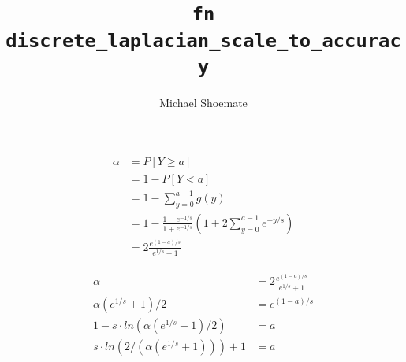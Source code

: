 \documentclass{article}
\title{\texttt{fn discrete\_laplacian\_scale\_to\_accuracy}}
\author{Michael Shoemate}
\begin{document}
\maketitle

\begin{align*}
    \alpha &= P[Y \ge a] \\
    &= 1 - P[Y < a] \\
    &= 1 - \sum_{y=0}^{a - 1} g(y) \\
    &= 1 - \frac{1 - e^{-1/s}}{1 + e^{-1/s}} \left(1 + 2\sum_{y=0}^{a - 1} e^{-y/s}\right) \\
    &= 2 \frac{e^{(1 - a)/s}}{e^{1/s} + 1}
\end{align*}

\begin{align*}
    \alpha &= 2 \frac{e^{(1 - a)/s}}{e^{1/s} + 1} \\
    \alpha (e^{1/s} + 1) / 2 &= e^{(1 - a)/s} \\
    1 - s \cdot ln(\alpha (e^{1/s} + 1) / 2) &= a \\
    s \cdot ln(2 / (\alpha (e^{1/s} + 1))) + 1 &= a
\end{align*}
\end{document}
